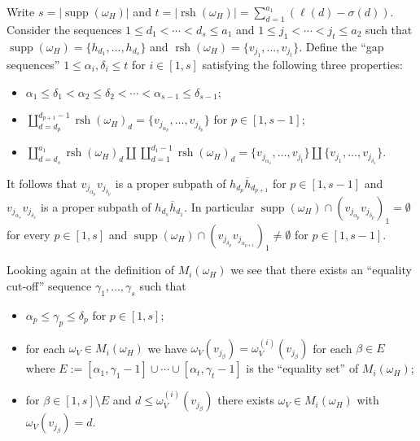 \documentclass{amsart}
\newcommand{\supp}{\operatorname{supp}}
\newcommand{\rsh}{\operatorname{rsh}}
\begin{document}
 Write $s=|\supp(\omega_H)|$ and $t=|\rsh(\omega_H)|=\sum\limits_{d=1}^{a_1}(\ell(d)-\sigma(d))$.  Consider the sequences $1\le d_1<\cdots<d_s\le a_1$ and $1\le j_1<\cdots<j_t\le a_2$ such that $\supp(\omega_H)=\{h_{d_1},\ldots,h_{d_s}\}$ and $\rsh(\omega_H)=\{v_{j_1},\ldots,v_{j_t}\}$.  Define the ``gap sequences'' $1\le\alpha_i,\delta_i\le t$ for $i\in[1,s]$ satisfying the following three properties:
 \begin{itemize}
  \item $\alpha_1\le\delta_1<\alpha_2\le\delta_2<\cdots<\alpha_{s-1}\le\delta_{s-1}$;
  \item $\coprod\limits_{d=d_p}^{d_{p+1}-1}\rsh(\omega_H)_d=\{v_{j_{\alpha_p}},\ldots,v_{j_{\delta_p}}\}$ for $p\in[1,s-1]$;
  \item $\coprod\limits_{d=d_s}^{a_1}\rsh(\omega_H)_d\amalg\coprod\limits_{d=1}^{d_1-1}\rsh(\omega_H)_d=\{v_{j_{\alpha_s}},\ldots,v_{j_t}\}\amalg\{v_{j_1},\ldots,v_{j_{\delta_s}}\}$.
 \end{itemize}
 It follows that $v_{j_{\alpha_p}}v_{j_{\delta_p}}$ is a proper subpath of $h_{d_p}\overline{h}_{d_{p+1}}$ for $p\in[1,s-1]$ and $v_{j_{\alpha_s}}v_{j_{\delta_s}}$ is a proper subpath of $h_{d_s}\overline{h}_{d_1}$.  In particular $\supp(\omega_H)\cap(v_{j_{\alpha_p}}v_{j_{\delta_p}})_1=\emptyset$ for every $p\in[1,s]$ and $\supp(\omega_H)\cap(v_{j_{\delta_p}}v_{j_{\alpha_{p+1}}})_1\ne\emptyset$ for $p\in[1,s-1]$.

 Looking again at the definition of $M_i(\omega_H)$ we see that there exists an ``equality cut-off'' sequence $\gamma_1,\ldots,\gamma_s$ such that 
 \begin{itemize}
  \item $\alpha_p\le\gamma_p\le\delta_p$ for $p\in[1,s]$;
  \item for each $\omega_V\in M_i(\omega_H)$ we have $\omega_V(v_{j_\beta})=\omega_V^{(i)}(v_{j_\beta})$ for each $\beta\in E$ where $E:=[\alpha_1,\gamma_1-1]\cup\cdots\cup[\alpha_t,\gamma_t-1]$ is the ``equality set'' of $M_i(\omega_H)$;
  \item for $\beta\in[1,s]\setminus E$ and $d\le \omega_V^{(i)}(v_{j_\beta})$ there exists $\omega_V\in M_i(\omega_H)$ with $\omega_V(v_{j_\beta})=d$.
 \end{itemize}
\end{document}
